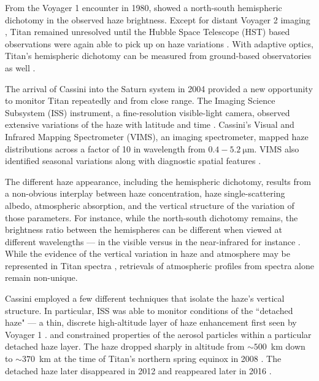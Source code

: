 \documentclass[tighten,linenumbers,twocolumn]{aastex631}
\begin{document}
From the Voyager 1 encounter in 1980, \citet{smith1981encounter} showed a north-south hemispheric dichotomy in the observed haze brightness.  Except for distant Voyager 2 imaging \citep{smith1982new}, Titan remained unresolved until the Hubble Space Telescope (HST) based observations were again able to pick up on haze variations \citep{caldwell1992titan, lorenz1997titan, lorenz1999seasonal, lorenz2001titan, young2002three, lorenz2004seasonal, Ádámkovics2006Titan, karkoschka2016seasonal, karkoschka2022titan}.  With adaptive optics, Titan's hemispheric dichotomy can be measured from ground-based observatories as well \citep{gibbard2004titan, adámkovics2017titan, nichols2021tracking}.

The arrival of Cassini into the Saturn system in 2004 provided a new opportunity to monitor Titan repeatedly and from close range.  The Imaging Science Subsystem (ISS) instrument, a fine-resolution visible-light camera, observed extensive variations of the haze with latitude and time \citep{porco2005titan, dekok2010titan,snell2024titan}.  Cassini's Visual and Infrared Mapping Spectrometer (VIMS), an imaging spectrometer, mapped haze distributions across a factor of 10 in wavelength from $0.4-5.2~\mathrm{\mu m}$.  VIMS also identified seasonal variations \citep{seignovert2021haze,vashist2023titan} along with diagnostic spatial features \citep{kutsop2022titan}.

The different haze appearance, including the hemispheric dichotomy, results from a non-obvious interplay between haze concentration, haze single-scattering albedo, atmospheric absorption, and the vertical structure of the variation of those parameters.  For instance, while the north-south dichotomy remains, the brightness ratio between the hemispheres can be different when viewed at different wavelengths --- in the visible versus in the near-infrared for instance \citep{vashist2023titan}.  While the evidence of the vertical variation in haze and atmosphere may be represented in Titan spectra \citep{rannou2010titan}, retrievals of atmospheric profiles from spectra alone remain non-unique.

Cassini employed a few different techniques that isolate the haze's vertical structure.  In particular, ISS was able to monitor conditions of the ``detached haze" --- a thin, discrete high-altitude layer of haze enhancement first seen by Voyager 1 \citep{smith1981encounter}.  \citet{lavvas2009titan} and \citet{seignovert2017titan}  constrained properties of the aerosol particles within a particular detached haze layer.  The haze dropped sharply in altitude from $\sim500$~km down to $\sim370$~km at the time of Titan's northern spring equinox in 2008 \citep{west2011evolution}.  The detached haze later disappeared in 2012 and reappeared later in 2016 \cite{west2018seasonal}.
\end{document}
